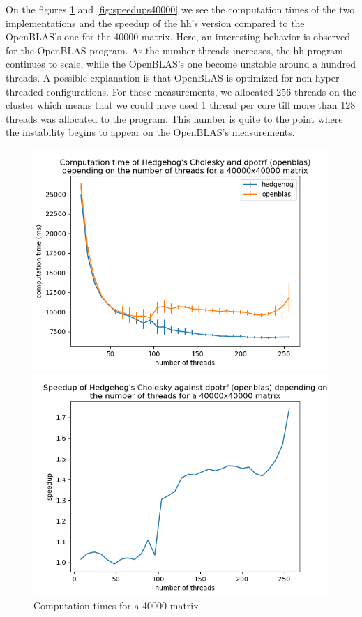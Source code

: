 On the figures \ref{fig:time40000} and \ref{fig:speedups40000} we see the
computation times of the two implementations and the speedup of the \gls{hh}'s
version compared to the OpenBLAS's one for the 40000 matrix. Here, an
interesting behavior is observed for the OpenBLAS program. As the number threads
increases, the \gls{hh} program continues to scale, while the OpenBLAS's one
become unstable around a hundred threads. A possible explanation is that
OpenBLAS is optimized for non-hyper-threaded configurations. For these
measurements, we allocated 256 threads on the cluster which means that we
could have used 1 thread per core till more than 128 threads was allocated to
the program. This number is quite to the point where the instability begins to
appear on the OpenBLAS's measurements.

\begin{figure}[!htb]
  \begin{minipage}{0.48\linewidth}
    \centering
    \includegraphics[scale=0.5]{img/cho-img/times-40000.png}
    \caption{Computation times for a 40000 matrix}
    \label{fig:time40000}
  \end{minipage}\hfill
  \begin{minipage}{0.48\linewidth}
    \centering
    \includegraphics[scale=0.5]{img/cho-img/speedup-40000.png}

\end{minipage}
\end{figure}
